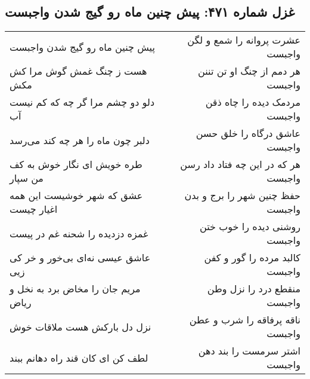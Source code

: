 \begin{center}
\section*{غزل شماره ۴۷۱: پیش چنین ماه رو گیج شدن واجبست}
\label{sec:0471}
\begin{longtable}{l p{0.5cm} r}
پیش چنین ماه رو گیج شدن واجبست
&&
عشرت پروانه را شمع و لگن واجبست
\\
هست ز چنگ غمش گوش مرا کش مکش
&&
هر دمم از چنگ او تن تننن واجبست
\\
دلو دو چشم مرا گر چه که کم نیست آب
&&
مردمک دیده را چاه ذقن واجبست
\\
دلبر چون ماه را هر چه کند می‌رسد
&&
عاشق درگاه را خلق حسن واجبست
\\
طره خویش ای نگار خوش به کف من سپار
&&
هر که در این چه فتاد داد رسن واجبست
\\
عشق که شهر خوشیست این همه اغیار چیست
&&
حفظ چنین شهر را برج و بدن واجبست
\\
غمزه دزدیده را شحنه غم در پیست
&&
روشنی دیده را خوب ختن واجبست
\\
عاشق عیسی نه‌ای بی‌خور و خر کی زیی
&&
کالبد مرده را گور و کفن واجبست
\\
مریم جان را مخاض برد به نخل و ریاض
&&
منقطع درد را نزل وطن واجبست
\\
نزل دل بارکش هست ملاقات خوش
&&
ناقه پرفاقه را شرب و عطن واجبست
\\
لطف کن ای کان قند راه دهانم ببند
&&
اشتر سرمست را بند دهن واجبست
\\
\end{longtable}
\end{center}
